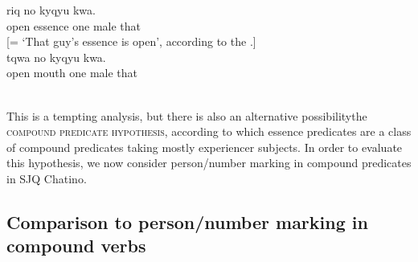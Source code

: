 \documentclass[output=paper]{langsci/langscibook}
\begin{document}
\begin{exe}
	\ex\label{ex:CruzStump:8} {{riq}} {{no}} {{kyqyu}} {{kwa}.}\\
	 {open} {essence} {one} {male} {that} \\
	{[}= `That guy's essence is open', according to the .{]} \\

	\ex\label{ex:CruzStump:9} {{tqwa} } {{no} } {{kyqyu}} {{kwa}.}\\
	 {open} {mouth} {one} {male} {that}\\
	\\
\end{exe}

This is a tempting analysis, but there is also an alternative possibility\textemdash the \textsc{compound predicate hypothesis}, according to which essence predicates are a class of compound predicates taking mostly experiencer subjects.  In order to evaluate this hypothesis, we now consider person/number marking in compound predicates in SJQ Chatino.  



\subsection{Comparison to person/number marking in compound verbs}
\label{sec:stump:3.3}
\end{document}

